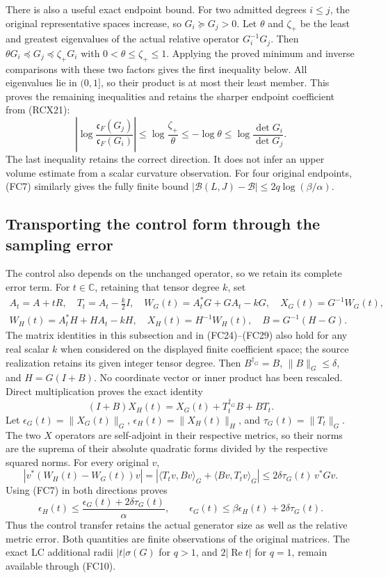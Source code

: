 There is also a useful exact endpoint bound. For two admitted degrees
$i\le j$, the original representative spaces increase, so $G_i\succeq
G_j>0$. Let $\theta$ and $\zeta_+$ be the least and greatest
eigenvalues of the actual relative operator $G_i^{-1}G_j$.
Then $\theta G_i\preceq G_j\preceq\zeta_+G_i$ with
$0<\theta\le\zeta_+\le1$. Applying the proved minimum and inverse
comparisons with these two factors gives the first inequality below.
All eigenvalues lie in $(0,1]$, so their product is at most their
least member. This proves the remaining inequalities and retains
the sharper endpoint coefficient from (RCX21):
\[
 \left|\log\frac{\mathfrak c_F(G_j)}{\mathfrak c_F(G_i)}\right|
 \le\log\frac{\zeta_+}{\theta}
 \le-\log\theta\le\log\frac{\det G_i}{\det G_j}.
 \tag{FC13}
\]
The last inequality retains the correct direction. It does not infer
an upper volume estimate from a scalar curvature observation.
For four original endpoints, (FC7) similarly gives the fully finite
bound $|\mathcal B(L,J)-\mathcal B|\le2q\log(\beta/\alpha)$.

\subsection{Transporting the control form through the sampling error}

The control also depends on the unchanged operator, so we retain its
complete error term. For $t\in\mathbb C$, retaining that tensor degree
$k$, set
\[
\begin{gathered}
 A_t=A+tR,\quad T_t=A_t-\tfrac k2I,\quad
 W_G(t)=A_t^*G+GA_t-kG,\quad X_G(t)=G^{-1}W_G(t),\\
 W_H(t)=A_t^*H+HA_t-kH,\quad X_H(t)=H^{-1}W_H(t),\quad
 B=G^{-1}(H-G).
\end{gathered}\tag{FC14}
\]
The matrix identities in this subsection and in (FC24)--(FC29)
also hold for any real scalar $k$ when considered on the displayed
finite coefficient space; the source realization retains its given
integer tensor degree.
Then $B^{\dagger_G}=B$, $\|B\|_G\le\delta$, and $H=G(I+B)$.
No coordinate vector or inner product has been rescaled. Direct
multiplication proves the exact identity
\[
 (I+B)X_H(t)=X_G(t)+T_t^{\dagger_G}B+BT_t.
 \tag{FC15}
\]
Let $\epsilon_G(t)=\|X_G(t)\|_G$, $\epsilon_H(t)=\|X_H(t)\|_H$,
and $\tau_G(t)=\|T_t\|_G$. The two $X$ operators are self-adjoint
in their respective metrics, so their norms are the suprema of their
absolute quadratic forms divided by the respective squared norms.
For every original $v$,
\[
 |v^*(W_H(t)-W_G(t))v|
 =|\langle T_tv,Bv\rangle_G+\langle Bv,T_tv\rangle_G|
 \le2\delta\tau_G(t)\,v^*Gv.
 \tag{FC16}
\]
Using (FC7) in both directions proves
\[
 \boxed{\epsilon_H(t)\le
  \frac{\epsilon_G(t)+2\delta\tau_G(t)}{\alpha},\qquad
 \epsilon_G(t)\le\beta\epsilon_H(t)+2\delta\tau_G(t).}
 \tag{FC17}
\]
Thus the control transfer retains the actual generator size as well as
the relative metric error. Both quantities are finite observations of
the original matrices. The exact LC additional radii
$|t|\sigma(G)$ for $q>1$, and $2|\operatorname{Re}t|$ for $q=1$,
remain available through (FC10).

